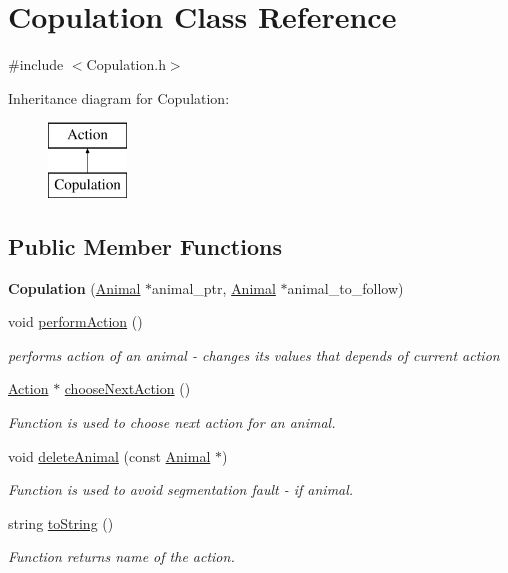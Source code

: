 \hypertarget{class_copulation}{}\section{Copulation Class Reference}
\label{class_copulation}


{\ttfamily \#include $<$Copulation.\+h$>$}

Inheritance diagram for Copulation\+:\begin{figure}[H]
\begin{center}
\leavevmode
\includegraphics[height=2.000000cm]{class_copulation}
\end{center}
\end{figure}
\subsection*{Public Member Functions}
\begin{DoxyCompactItemize}
\item 
\hypertarget{class_copulation_a2260fde409e5e713ba90b6cedc2c1769}{}{\bfseries Copulation} (\hyperlink{class_animal}{Animal} $\ast$animal\+\_\+ptr, \hyperlink{class_animal}{Animal} $\ast$animal\+\_\+to\+\_\+follow)\label{class_copulation_a2260fde409e5e713ba90b6cedc2c1769}

\item 
void \hyperlink{class_copulation_ae84cabc1a26df3f94032b6f1df3ff5b9}{perform\+Action} ()
\begin{DoxyCompactList}\small\item\em performs action of an animal -\/ changes it\textquotesingle{}s values that depends of current action \end{DoxyCompactList}\item 
\hyperlink{class_action}{Action} $\ast$ \hyperlink{class_copulation_af3fa52c2093c2f88d0fbaba9ea0209b7}{choose\+Next\+Action} ()
\begin{DoxyCompactList}\small\item\em Function is used to choose next action for an animal. \end{DoxyCompactList}\item 
void \hyperlink{class_copulation_aa13219c19de17875ba71411b1a38f2cc}{delete\+Animal} (const \hyperlink{class_animal}{Animal} $\ast$)
\begin{DoxyCompactList}\small\item\em Function is used to avoid segmentation fault -\/ if animal. \end{DoxyCompactList}\item 
string \hyperlink{class_copulation_a111bbe080ab451f6fa070345281b76ee}{to\+String} ()
\begin{DoxyCompactList}\small\item\em Function returns name of the action. \end{DoxyCompactList}\end{DoxyCompactItemize}
